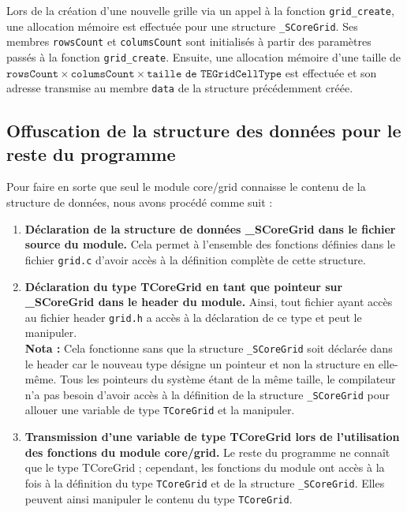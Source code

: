 \documentclass{book}
\begin{document}
Lors de la création d'une nouvelle grille via un appel à la fonction \verb|grid_create|, une allocation mémoire est effectuée pour une structure \verb|_SCoreGrid|. Ses membres \verb|rowsCount| et \verb|columsCount| sont initialisés à partir des paramètres passés à la fonction \verb|grid_create|. Ensuite, une allocation mémoire d'une taille de $\texttt{rowsCount} \times \texttt{columsCount} \times \texttt{taille de TEGridCellType}$ est effectuée et son adresse transmise au membre \verb|data| de la structure précédemment créée.


\subsection{Offuscation de la structure des données pour le reste du programme}

Pour faire en sorte que seul le module \mbox{core/grid} connaisse le contenu de la structure de données, nous avons procédé comme suit :

\begin{enumerate}
	\item \textbf{Déclaration de la structure de données \_SCoreGrid dans le fichier source du module.} Cela permet à l'ensemble des fonctions définies dans le fichier \verb|grid.c| d'avoir accès à la définition complète de cette structure.
	
	\item \textbf{Déclaration du type TCoreGrid en tant que pointeur sur \_SCoreGrid dans le header du module.} Ainsi, tout fichier ayant accès au fichier header \verb|grid.h| a accès à la déclaration de ce type et peut le manipuler.\\
	\textbf{Nota :} Cela fonctionne sans que la structure \verb|_SCoreGrid| soit déclarée dans le header car le nouveau type désigne un pointeur et non la structure en elle-même. Tous les pointeurs du système étant de la même taille, le compilateur n'a pas besoin d'avoir accès à la définition de la structure \verb|_SCoreGrid| pour allouer une variable de type \verb|TCoreGrid| et la manipuler.
	
	\item \textbf{Transmission d'une variable de type TCoreGrid lors de l'utilisation des fonctions du module \mbox{core/grid}.} Le reste du programme ne connaît que le type TCoreGrid ; cependant,  les fonctions du module ont accès à la fois à la définition du type \verb|TCoreGrid| et de la structure \verb|_SCoreGrid|. Elles peuvent ainsi manipuler le contenu du type \verb|TCoreGrid|.
\end{enumerate}
\end{document}
